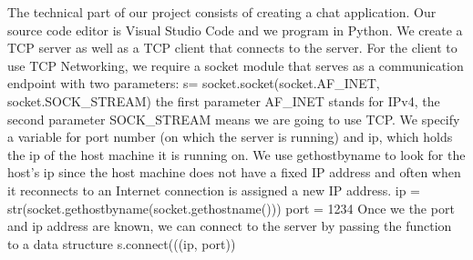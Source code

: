 The technical part of our project consists of creating a chat application. Our source code editor is Visual Studio Code and we program in Python. We create a TCP server as well as a TCP client that connects to the server. 
For the client to use TCP Networking, we require a socket module that serves as a communication endpoint with two parameters:
s= socket.socket(socket.AF\_INET, socket.SOCK\_STREAM)
the first parameter AF\_INET stands for IPv4, the second parameter SOCK\_STREAM means we are going to use TCP. We specify a variable for port number (on which the server is running) and ip, which holds the ip of the host machine it is running on. We use gethostbyname to look for the host’s ip since the host machine does not have a fixed IP address and often when it reconnects to an Internet connection is assigned a new IP address.
ip = str(socket.gethostbyname(socket.gethostname()))
port = 1234
Once we the port and ip address are known, we can connect to the server by passing the function to a data structure s.connect(((ip, port))

